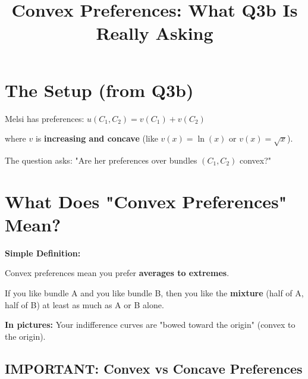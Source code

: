 \documentclass[12pt]{article}
\title{\textbf{Convex Preferences: What Q3b Is Really Asking}}
\author{}
\date{}
\begin{document}
\maketitle

\section*{The Setup (from Q3b)}

Melsi has preferences: $u(C_1, C_2) = v(C_1) + v(C_2)$

where $v$ is \textbf{increasing and concave} (like $v(x) = \ln(x)$ or $v(x) = \sqrt{x}$).

The question asks: "Are her preferences over bundles $(C_1, C_2)$ convex?"

\section*{What Does "Convex Preferences" Mean?}

\begin{tcolorbox}[colback=blue!5!white,colframe=blue!75!black]
\textbf{Simple Definition:}

Convex preferences mean you prefer \textbf{averages to extremes}.

If you like bundle A and you like bundle B, then you like the \textbf{mixture} (half of A, half of B) at least as much as A or B alone.

\vspace{0.3cm}

\textbf{In pictures:} Your indifference curves are "bowed toward the origin" (convex to the origin).
\end{tcolorbox}

\subsection*{IMPORTANT: Convex vs Concave Preferences}
\end{document}
